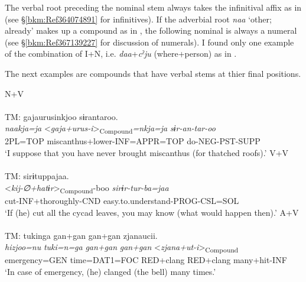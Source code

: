 \noindent The verbal root preceding the nominal stem always takes the infinitival affix as in  (see §\ref{bkm:Ref364074891} for infinitives). If the adverbial root \textit{naa} ‘other; already’ makes up a compound as in , the following nominal is always a numeral (see §\ref{bkm:Ref367139227} for discussion of numerals). I found only one example of the combination of I+N, i.e. \textit{daa}+\textit{cˀju} (where+person) as in .

The next examples are compounds that have verbal stems at thier final positions.

\ea
\ea N+V\hfill\relax[Co: 110328\_00.txt]\\\label{ex:4.25a}
\\
 {TM:}  {gajaurusinkjoo} {sɨrantaroo.}\\
  {\itshape naakja=ja} {<\textit{gaja+urus-i}>\textsubscript{Compound}\textit{=nkja=ja}} {\itshape sɨr-an-tar-oo}\\
  {2PL=TOP} {miscanthus+lower-INF=APPR=TOP} {do-NEG-PST-SUPP}\\
  \glt{} ‘I suppose that you have never brought miscanthus (for thatched roofs).’
\ex V+V\hfill\relax[Co: 111113\_01.txt]\\\label{ex:4.25b}
 \\
 {TM:}  {sirɨtuppajaa.}\\
  {<\textit{kij-∅+hatɨr}>\textsubscript{Compound}\textit{}-boo} {\itshape sirɨr-tur-ba=jaa}\\
  {cut-INF+thoroughly-CND} {easy.to.understand-PROG-CSL=SOL}\\
  \glt{} ‘If (he) cut all the cycad leaves, you may know (what would happen then).’
\ex A+V\hfill\relax[Co: 111113\_02.txt]\\\label{ex:4.25c}
\\
 {TM:}  {tukinga} {gan+gan} {gan+gan} {zjanaucii.}\\
  {\itshape hizjoo=nu} {\itshape tuki=n=ga} {\itshape gan+gan} {\itshape gan+gan} {<\textit{zjana+ut-i}>\textsubscript{Compound}}\\
  {emergency=GEN} {time=DAT1=FOC} {RED+clang} {RED+clang} {many+hit-INF}\\ 
  \glt{} ‘In case of emergency, (he) clanged (the bell) many times.’
\z
\z

